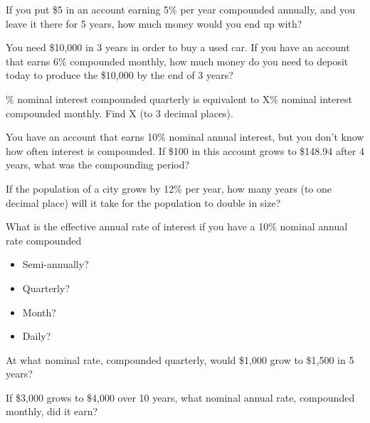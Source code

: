 \documentclass[12pt]{exam}
\begin{document}
\begin{questions}

    \question If you put \$5 in an account earning 5\% per year compounded annually, and you leave it
    there for 5 years, how much money would you end up with?
    \vspace{2in}

    \question You need \$10,000 in 3 years in order to buy a used car. If you have an account
    that earns 6\% compounded monthly, how much money do you need to deposit today to
    produce the \$10,000 by the end of 3 years?
    \vspace{2in}

    \% nominal interest compounded quarterly is equivalent to X\% nominal interest
    compounded monthly. Find X (to 3 decimal places).
    \vspace{2in}

    \question You have an account that earns 10\% nominal annual interest, but you don’t know how
    often interest is compounded. If \$100 in this account grows to \$148.94 after 4 years, what
    was the compounding period?
    \vspace{1.5in}

    \question If the population of a city grows by 12\% per year, how many years (to one decimal place) will it take for
    the population to double in size?
    \vspace{1.5in}

    \question What is the effective annual rate of interest if you have a 10\% nominal annual
    rate compounded
    \begin{itemize}
        \item Semi-annually?
        \item Quarterly?
        \item Month?
        \item Daily?
    \end{itemize}
    \vspace{2in}

    \question At what nominal rate, compounded quarterly, would \$1,000 grow to \$1,500 in 5 years?
    \vspace{2in}

    \question If \$3,000 grows to \$4,000 over 10 years, what nominal annual rate, compounded
    monthly, did it earn?
    \vspace{2in}

\end{questions}
\end{document}
